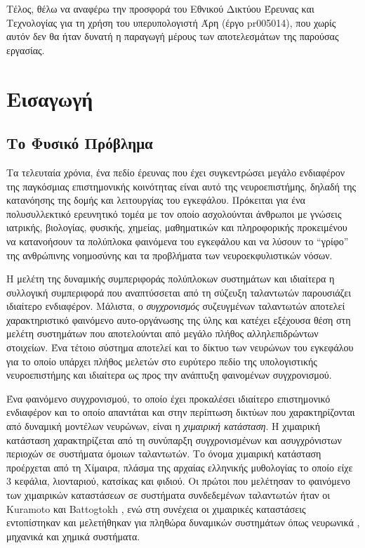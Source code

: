 \documentclass[12pt,a4paper]{article}
\begin{document}
Τέλος, θέλω να αναφέρω την προσφορά του Εθνικού Δικτύου Έρευνας και Τεχνολογίας για τη χρήση του υπερυπολογιστή Άρη (έργο pr005014), που χωρίς αυτόν δεν θα ήταν δυνατή η παραγωγή μέρους των αποτελεσμάτων της παρούσας εργασίας.

\newpage

\tableofcontents
\newpage
\listoffigures
\newpage

\section{Εισαγωγή}

\subsection{Το Φυσικό Πρόβλημα}

Τα τελευταία χρόνια, ένα πεδίο έρευνας που έχει συγκεντρώσει μεγάλο ενδιαφέρον της παγκόσμιας επιστημονικής κοινότητας είναι αυτό της νευροεπιστήμης, δηλαδή της κατανόησης της δομής και λειτουργίας του εγκεφάλου. Πρόκειται για ένα πολυσυλλεκτικό ερευνητικό τομέα με τον οποίο ασχολούνται άνθρωποι με γνώσεις ιατρικής, βιολογίας, φυσικής, χημείας, μαθηματικών και πληροφορικής προκειμένου να κατανοήσουν τα πολύπλοκα φαινόμενα του εγκεφάλου και να λύσουν το ``γρίφο'' της ανθρώπινης νοημοσύνης και τα προβλήματα των νευροεκφυλιστικών νόσων.

Η μελέτη της δυναμικής συμπεριφοράς πολύπλοκων συστημάτων και ιδιαίτερα η συλλογική συμπεριφορά που αναπτύσσεται από τη σύζευξη ταλαντωτών παρουσιάζει ιδιαίτερο ενδιαφέρον. Μάλιστα, ο \textit{συγχρονισμός} συζευγμένων ταλαντωτών αποτελεί χαρακτηριστικό φαινόμενο αυτο-οργάνωσης της ύλης και κατέχει εξέχουσα θέση στη μελέτη συστημάτων που αποτελούνται από μεγάλο πλήθος αλληλεπιδρώντων στοιχείων. Ένα τέτοιο σύστημα αποτελεί και το δίκτυο των νευρώνων του εγκεφάλου για το οποίο υπάρχει πλήθος μελετών στο ευρύτερο πεδίο της υπολογιστικής νευροεπιστήμης και ιδιαίτερα ως προς την ανάπτυξη φαινομένων συγχρονισμού.

Ένα φαινόμενο συγχρονισμού, το οποίο έχει προκαλέσει ιδιαίτερο επιστημονικό ενδιαφέρον και το οποίο απαντάται και στην περίπτωση δικτύων που χαρακτηρίζονται από δυναμική μοντέλων νευρώνων, είναι η \textit{χιμαιρική κατάσταση}. Η χιμαιρική κατάσταση χαρακτηρίζεται από τη συνύπαρξη συγχρονισμένων και ασυγχρόνιστων περιοχών σε συστήματα όμοιων ταλαντωτών. Το όνομα χιμαιρική κατάσταση προέρχεται από τη Χίμαιρα, πλάσμα της αρχαίας ελληνικής μυθολογίας το οποίο είχε 3 κεφάλια, λιονταριού, κατσίκας και φιδιού. Οι πρώτοι που μελέτησαν το φαινόμενο των χιμαιρικών καταστάσεων σε συστήματα συνδεδεμένων ταλαντωτών ήταν οι Kuramoto και Battogtokh \cite{kuramoto_coexistence_2002}, ενώ στη συνέχεια οι χιμαιρικές καταστάσεις εντοπίστηκαν και μελετήθηκαν για πληθώρα δυναμικών συστημάτων όπως νευρωνικά \cite{hizanidis_chimera_2014}, μηχανικά \cite{martens_chimera_2013} και χημικά \cite{tinsley_chimera_2012} συστήματα.
\end{document}

